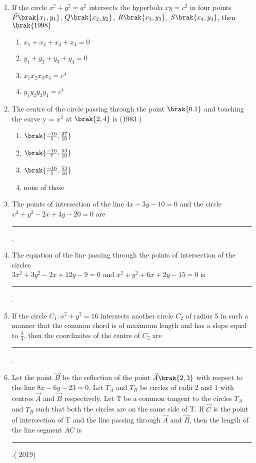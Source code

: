 \begin{enumerate}
\item If the circle $x^2+y^2=a^2$ intersects the hyperbola $xy=c^2$ in four points $\vec{P}\brak{x_1, y_1}$, $Q\brak{x_2, y_2}$, $R\brak{x_3, y_3}$, $S\brak{x_4, y_4}$, then
%
    \hfill$\brak{1998}$
\begin{multicols}{2}
\begin{enumerate}
    \item $x_1+x_2+x_3+x_4=0$
    \item $y_1+y_2+y_3+y_4=0$
    \item $x_1x_2x_3x_4=c^4$
    \item $y_1y_2y_3y_4=c^4$
%
\end{enumerate}
\end{multicols}
    \item The centre of the circle passing through the point $\brak{0.1}$ and touching the curve y = $x^{2}$ at $\brak{2, 4}$ is
    \hfill {(1983 )}
    	\begin{multicols}{2}
\begin{enumerate}
    		\item $\brak{\frac{-16}{5}, \frac{27}{10}}$
    		\item $\brak{\frac{-16}{7}, \frac{53}{10}}$
    		\item $\brak{\frac{-16}{5}, \frac{53}{10}}$
    		\item none of these
    	\end{enumerate}
    \end{multicols}
\item The points of intersection of the line $4x-3y-10=0$ and the circle $x^{2}+y^{2}-2x+4y-20=0$ are    \rule{1cm}{0.01pt}.
	\hfill{}
\item The equation of the line passing through the points of intersection of the circles\\ $3x^{2}+3y^{2}-2x+12y-9=0$ and $x^{2}+y^{2}+6x+2y-15=0$ is
\rule{1cm}{0.01pt}.
	\hfill{}
\item If the circle $C_1:x^{2}+y^{2}=16$ intersects another circle $C_2$ of radius 5 in such a manner that the common chord is of maximum length and has a slope equal to $\frac{3}{4}$,  then the coordinates of the centre of $C_2$ are
\rule{1cm}{0.01pt}.
%
	\hfill{}
\item Let the point $\vec{B}$ be the reflection of the point $\vec{A}\brak{2, 3}$ with respect to the line $8x-6y-23=0$. Let $T_A$ and $T_B$ be circles of radii $2$ and $1$ with centres $\vec{A}$ and $\vec{B}$ respectively. Let T be a common tangent to the circles $T_A$ and $T_B$ such that both the circles are on the same side of T. If $\vec{C}$ is the point of intersection of T and the line passing through $\vec{A}$ and $\vec{B}$, then the length of the line segment $AC$ is  \rule{1cm}{0.01pt}.\hfill( 2019)

\end{enumerate}
